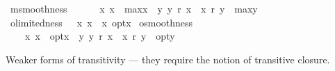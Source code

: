 \begin{isabellebody}
\isamarkupfalse%
\ {\isachardoublequoteopen}msmoothness\ {\isasymequiv}\ \isanewline
\ \ \ {\isacharparenleft}{\kern0pt}{\isasymforall}{\isasymphi}\ x{\isachardot}{\kern0pt}\ {\isacharparenleft}{\kern0pt}{\isacharparenleft}{\kern0pt}{\isasymphi}{\isacharparenright}{\kern0pt}x\ {\isasymlongrightarrow}\ {\isacharparenleft}{\kern0pt}max{\isacharless}{\kern0pt}{\isasymphi}{\isachargreater}{\kern0pt}x\ {\isasymor}\ {\isacharparenleft}{\kern0pt}{\isasymexists}y{\isachardot}{\kern0pt}\ {\isacharparenleft}{\kern0pt}y\ \isactrlbold r\ x\ {\isasymand}\ {\isasymnot}{\isacharparenleft}{\kern0pt}x\ \isactrlbold r\ y{\isacharparenright}{\kern0pt}\ {\isasymand}\ max{\isacharless}{\kern0pt}{\isasymphi}{\isachargreater}{\kern0pt}y{\isacharparenright}{\kern0pt}{\isacharparenright}{\kern0pt}{\isacharparenright}{\kern0pt}{\isacharparenright}{\kern0pt}{\isacharparenright}{\kern0pt}{\isachardoublequoteclose}\isanewline
{}\isamarkupfalse%
\ {\isachardoublequoteopen}olimitedness\ {\isasymequiv}\ {\isacharparenleft}{\kern0pt}{\isasymforall}{\isasymphi}{\isachardot}{\kern0pt}\ {\isacharparenleft}{\kern0pt}{\isasymexists}x{\isachardot}{\kern0pt}\ {\isacharparenleft}{\kern0pt}{\isasymphi}{\isacharparenright}{\kern0pt}x{\isacharparenright}{\kern0pt}\ {\isasymlongrightarrow}\ {\isacharparenleft}{\kern0pt}{\isasymexists}x{\isachardot}{\kern0pt}\ opt{\isacharless}{\kern0pt}{\isasymphi}{\isachargreater}{\kern0pt}x{\isacharparenright}{\kern0pt}{\isacharparenright}{\kern0pt}{\isachardoublequoteclose}\isanewline
{}\isamarkupfalse%
\ {\isachardoublequoteopen}osmoothness\ {\isasymequiv}\ \isanewline
\ \ \ {\isacharparenleft}{\kern0pt}{\isasymforall}{\isasymphi}\ x{\isachardot}{\kern0pt}\ {\isacharparenleft}{\kern0pt}{\isacharparenleft}{\kern0pt}{\isasymphi}{\isacharparenright}{\kern0pt}x\ {\isasymlongrightarrow}\ {\isacharparenleft}{\kern0pt}opt{\isacharless}{\kern0pt}{\isasymphi}{\isachargreater}{\kern0pt}x\ {\isasymor}\ {\isacharparenleft}{\kern0pt}{\isasymexists}y{\isachardot}{\kern0pt}\ {\isacharparenleft}{\kern0pt}y\ \isactrlbold r\ x\ {\isasymand}\ {\isasymnot}{\isacharparenleft}{\kern0pt}x\ \isactrlbold r\ y{\isacharparenright}{\kern0pt}\ {\isasymand}\ opt{\isacharless}{\kern0pt}{\isasymphi}{\isachargreater}{\kern0pt}y{\isacharparenright}{\kern0pt}{\isacharparenright}{\kern0pt}{\isacharparenright}{\kern0pt}{\isacharparenright}{\kern0pt}{\isacharparenright}{\kern0pt}{\isachardoublequoteclose}%
\begin{isamarkuptext}%
Weaker forms of transitivity — they require the notion of
transitive closure.%

\end{isamarkuptext}
\end{isabellebody}
